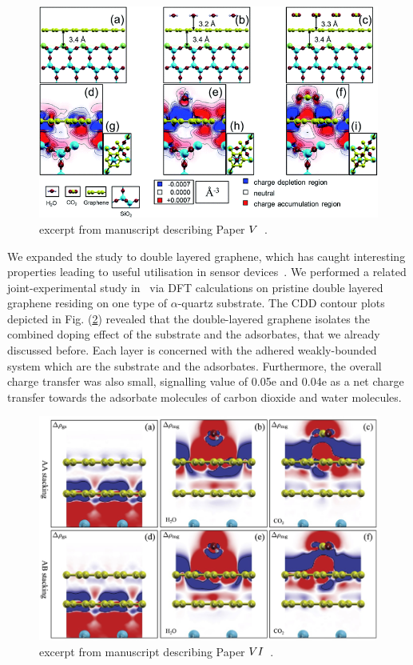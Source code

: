 \begin{figure}
    \centering
    \includegraphics[width=\textwidth]{Figs/Paper5.png} %
    \caption{excerpt from manuscript describing Paper \hyperref[P5]{$\Rmnum{5}$}~\cite{Smith2017}.}
    \label{paper5}
\end{figure}

We expanded the study to double layered graphene, which has caught interesting properties leading to useful utilisation in sensor devices~\cite{Melios2016, Yakovkin2016}. We performed a related joint-experimental study in~\cite{Xuge2017} via DFT calculations on pristine double layered graphene residing on one type of $\alpha$-quartz substrate. The CDD contour plots depicted in Fig. (\ref{paper6}) revealed that the double-layered graphene isolates the combined doping effect of the substrate and the adsorbates, that we already discussed before. Each layer is concerned with the adhered weakly-bounded system which are the substrate and the adsorbates. Furthermore, the overall charge transfer was also small, signalling value of 0.05e and 0.04e as a net charge transfer towards the adsorbate molecules of carbon dioxide and water molecules.

\begin{figure}
    \centering
    \includegraphics[width=\textwidth]{Figs/Paper6.jpg} %
    \caption{excerpt from manuscript describing Paper \hyperref[P6]{$\Rmnum{6}$}~\cite{Xuge2017}.}
    \label{paper6}
\end{figure}

